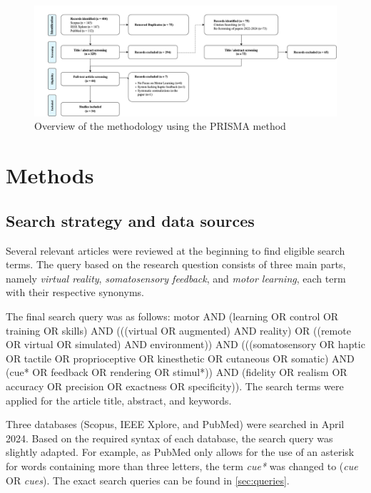 
\begin{figure}[htbp]
    \centering
    \includegraphics[width=\linewidth]{figures/prisma_overview.png} 
    \caption{Overview of the methodology using the PRISMA method}
    \label{fig:prisma}
\end{figure} 

\section{Methods}

\subsection{Search strategy and data sources}
Several relevant articles were reviewed at the beginning to find eligible search terms. The query based on the research question consists of three main parts, namely \textit{virtual reality}, \textit{somatosensory feedback}, and \textit{motor learning}, each term with their respective synonyms. 

The final search query was as follows: motor AND (learning OR control OR training OR skills) AND (((virtual OR augmented) AND reality) OR ((remote OR virtual OR simulated) AND environment)) AND (((somatosensory OR haptic OR tactile OR proprioceptive OR kinesthetic OR cutaneous OR somatic) AND 
(cue* OR feedback OR rendering OR stimul*)) AND (fidelity OR realism OR accuracy OR precision OR exactness OR specificity)). The search terms were applied for the article title, abstract, and keywords.

Three databases (Scopus, IEEE Xplore, and PubMed) were searched in April 2024. Based on the required syntax of each database, the search query was slightly adapted. For example, as PubMed only allows for the use of an asterisk for words containing more than three letters, the term \textit{cue*} was changed to (\textit{cue} OR \textit{cues}). The exact search queries can be found in \ref{sec:queries}. 

